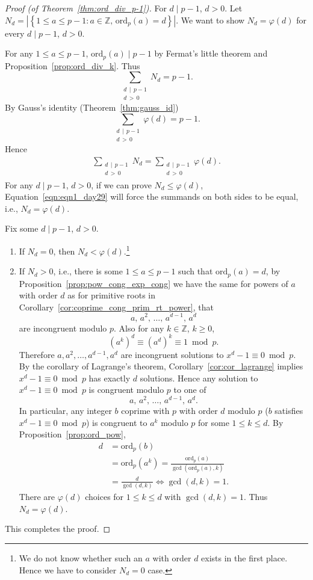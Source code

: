 \documentclass{amsbook}
\theoremstyle{plain}
\theoremstyle{definition}
\theoremstyle{remark}
\numberwithin{equation}{chapter}
\numberwithin{figure}{chapter}
\newcommand{\Z}{\mathbb{Z}}
\newcommand*{\ord}{\text{ord}}
\begin{document}
\begin{proof}[Proof {\rm (of Theorem~\ref{thm:ord_div_p-1})}]
  For $d \mid p-1$, $d > 0$. Let $N_d = | \left\{ 1 \leqslant a \leqslant p-1 : a \in \Z, \, \ord_p (a) = d \right\} |$. We want to show $N_d = \varphi (d)$ for every $d \mid p - 1$, $d > 0$.

  For any $1 \leqslant a \leqslant p - 1$, $\ord_p (a) \mid p-1$ by Fermat's little theorem and Proposition~\ref{prop:ord_div_k}. Thus 
\[
\sum_{\substack{d \, \mid \, p-1 \\ d \, > \, 0}} N_d = p - 1.
\]
By Gauss's identity (Theorem~\ref{thm:gauss_id})
\[
\sum_{\substack{d \, \mid \, p-1 \\ d \, > \, 0}} \varphi (d) = p - 1.
\]
Hence 
\begin{align}\label{eqn:eqn1_day29}
\sum_{\substack{d \, \mid \, p-1 \\ d \, > \, 0}} N_d = \sum_{\substack{d \, \mid \, p-1 \\ d \, > \, 0}} \varphi (d).
\end{align}
For any $d \mid p - 1$, $d > 0$, if we can prove $N_d \leqslant \varphi (d)$, Equation~\eqref{eqn:eqn1_day29} will force the summands on both sides to be equal, i.e., $N_d = \varphi (d)$.

Fix some $d \mid p - 1$, $d > 0$.
\begin{enumerate}[label=(\roman*)]
\item If $N_d = 0$, then $N_d < \varphi (d)$.\footnote{We do not know whether such an $a$ with order $d$ exists in the first place. Hence we have to consider $N_d = 0$ case.}
\item If $N_d > 0$, i.e., there is some $1 \leqslant a \leqslant p-1$ such that $\ord_p (a) = d$, by Proposition~\ref{prop:pow_cong_exp_cong} we have the same for powers of $a$ with order $d$ as for primitive roots in Corollary~\ref{cor:coprime_cong_prim_rt_power}, that 
\[
a, \, a^2, \,\ldots,\, a^{d - 1}, \, a^d
\]
are incongruent modulo $p$. Also for any $k \in \Z$, $k \geqslant 0$,
\[
(a^k)^d \equiv (a^d)^k \equiv 1 \bmod p.
\]
Therefore $a, a^2, \ldots, a^{d - 1}, a^d$ are incongruent solutions to $x^d - 1 \equiv 0 \bmod p$. By the corollary of Lagrange's theorem, Corollary~\ref{cor:cor_lagrange} implies $x^d - 1 \equiv 0 \bmod p$ has exactly $d$ solutions. Hence any solution to $x^d - 1 \equiv 0 \bmod p$ is congruent modulo $p$ to one of
\[
a, \, a^2, \,\ldots,\, a^{d - 1}, \, a^d.
\]
In particular, any integer $b$ coprime with $p$ with order $d$ modulo $p$ ($b$ satisfies $x^d - 1 \equiv 0 \bmod p$) is congruent to $a^k$ modulo $p$ for some $1 \leqslant k \leqslant d$. By Proposition~\ref{prop:ord_pow},
\begin{align}
d &= \ord_p (b) \\
  &= \ord_p (a^k) = \frac{\ord_p (a)}{\gcd (\ord_p (a), k)} \\
  &= \frac{d}{\gcd (d, k)} \iff \gcd (d, k) = 1.
\end{align}
There are $\varphi (d)$ choices for $1 \leqslant k \leqslant d$ with $\gcd (d, k) = 1$. Thus $N_d = \varphi (d)$. 
\end{enumerate}

This completes the proof.
\end{proof}
\end{document}

